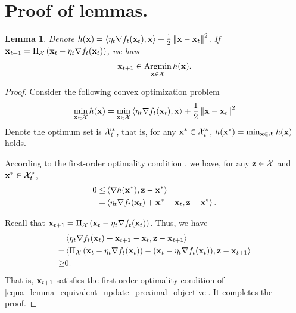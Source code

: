 \documentclass{article}
\newtheorem{Lemma}{\bf{Lemma}}
\begin{document}
\section*{ Proof of lemmas.}

\begin{Lemma}
\label{lemma_equivalent_update_proximal}
Denote $h({\bf x} )  = \left\langle\eta_t \nabla f_t({\bf x}_t), {\bf x} \right\rangle + \frac{1}{2}\left\lVert{\bf x} - {\bf x}_t\right\rVert^2$.  If ${\bf x}_{t+1} = \Pi_{{\mathcal{X}}} \left(  {\bf x}_t - \eta_t \nabla f_t({\bf x}_t)  \right)$, we have
\begin{align}
\nonumber
\x_{t+1} \in \Argmin_{\x\in\Xcal} h(\x).
\end{align}

\end{Lemma}
\begin{proof}
Consider the following convex optimization problem 
\begin{align}
\label{equa_lemma_equivalent_update_proximal_objective}
\min_{{\bf x}\in {\mathcal{X}}} h({\bf x} )  = \min_{{\bf x}\in {\mathcal{X}}} \left\langle\eta_t \nabla f_t({\bf x}_t), {\bf x} \right\rangle + \frac{1}{2}\left\lVert{\bf x} - {\bf x}_t\right\rVert^2
\end{align} Denote the optimum set is ${\mathcal{X}}_t^{\ast}$, that is, for any ${\bf x}^\ast \in {\mathcal{X}}_t^{\ast}$, $h({\bf x}^\ast) = \min_{{\bf x}\in {\mathcal{X}}} h({\bf x} )$ holds. 

According to the first-order optimality condition \cite{Boyd:2004}, we have, for any ${\bf z}\in{\mathcal{X}}$ and ${\bf x}^\ast\in{\mathcal{X}}_t^\ast$,
\begin{align}
\nonumber
0 \le & \left\langle \nabla h({\bf x}^\ast), {\bf z} - {\bf x}^\ast \right\rangle \\ \label{equa_lemma_equivalent_update_proximal}
= & \left\langle \eta_t \nabla f_t({\bf x}_t) + {\bf x}^\ast - {\bf x}_t, {\bf z} - {\bf x}^\ast \right\rangle.
\end{align} 

Recall that ${\bf x}_{t+1} = \Pi_{{\mathcal{X}}} \left(  {\bf x}_t - \eta_t \nabla f_t({\bf x}_t)  \right)$.
Thus, we have
\begin{align}
\nonumber
& \left\langle \eta_t \nabla f_t({\bf x}_t) + {\bf x}_{t+1} - {\bf x}_t, {\bf z} - {\bf x}_{t+1} \right\rangle \\ \nonumber
= & \left\langle \Pi_{{\mathcal{X}}} \left(  {\bf x}_t - \eta_t \nabla f_t({\bf x}_t)  \right) - ({\bf x}_t - \eta_t \nabla f_t({\bf x}_t)), {\bf z} - {\bf x}_{t+1} \right\rangle \\ \nonumber
\ge & 0.
\end{align}  That is, ${\bf x}_{t+1}$ satisfies the first-order optimality condition of \eqref{equa_lemma_equivalent_update_proximal_objective}. It completes the proof.
\end{proof}
\end{document}
